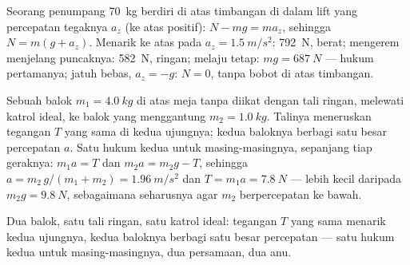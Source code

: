 \begin{example}[Lift]\label{ex:g12:newtons-laws:elevator}
Seorang penumpang \qty{70}{kg} berdiri di atas timbangan di dalam lift yang percepatan
tegaknya $a_z$ (ke atas positif): $N - mg = ma_z$, sehingga $N = m(g + a_z)$. Menarik
ke atas pada $a_z = \qty{1.5}{m/s^2}$: \qty{792}{N}, berat; mengerem menjelang
puncaknya: \qty{582}{N}, ringan; melaju tetap: $mg = \qty{687}{N}$ --- hukum
pertamanya; jatuh bebas, $a_z = -g$:
$N = 0$, tanpa bobot di atas timbangan.
\end{example}

\begin{example}\label{ex:g12:newtons-laws:pulley}
Sebuah balok $m_1 = \qty{4.0}{kg}$ di atas meja tanpa  diikat dengan tali
ringan, melewati katrol ideal, ke balok yang menggantung $m_2 = \qty{1.0}{kg}$.
Talinya meneruskan tegangan $T$ yang sama di kedua ujungnya; kedua baloknya berbagi
satu besar percepatan $a$. Satu hukum kedua untuk masing-masingnya, sepanjang tiap
geraknya: $m_1 a = T$ dan $m_2 a = m_2 g - T$, sehingga
$a = m_2\,g/(m_1 + m_2) = \qty{1.96}{m/s^2}$ dan $T = m_1 a = \qty{7.8}{N}$ ---
lebih kecil daripada $m_2 g = \qty{9.8}{N}$, sebagaimana seharusnya agar $m_2$
berpercepatan ke bawah.
\end{example}

\begin{omfigure}

{\small Dua balok, satu tali ringan, satu katrol ideal: tegangan $T$ yang sama menarik
kedua ujungnya, kedua baloknya berbagi satu besar percepatan --- satu hukum kedua
untuk masing-masingnya, dua persamaan, dua anu.}
\end{omfigure}

